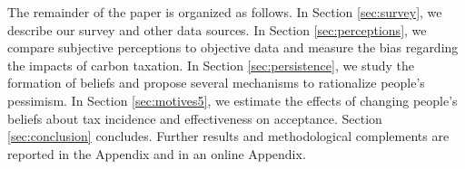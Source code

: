 \documentclass[12pt]{article} %
\begin{document}


The remainder of the paper is organized as follows. In Section \ref{sec:survey}, we describe our survey and other data sources. In Section \ref{sec:perceptions}, we compare subjective perceptions to objective data and measure the bias regarding the impacts of carbon taxation. In Section \ref{sec:persistence}, we study the formation of beliefs and propose several mechanisms to rationalize people's pessimism. In Section \ref{sec:motives5}, we estimate the effects of changing people's beliefs about tax incidence and effectiveness on acceptance. Section \ref{sec:conclusion} concludes. Further results and methodological complements are reported in the Appendix and in an online Appendix. %
\end{document}
